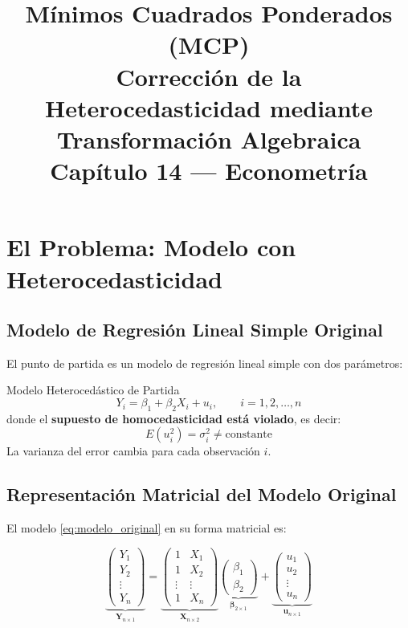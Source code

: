 \documentclass[12pt,a4paper]{article}
\title{
  \textbf{\Large Mínimos Cuadrados Ponderados (MCP)}\\[0.5em]
  \large Corrección de la Heterocedasticidad mediante Transformación Algebraica\\[0.5em]
  \normalsize Capítulo 14 --- Econometría
}
\author{}
\date{}
\begin{document}
\maketitle
\tableofcontents
\newpage

\section{El Problema: Modelo con Heterocedasticidad}

\subsection{Modelo de Regresión Lineal Simple Original}

El punto de partida es un modelo de regresión lineal simple con dos parámetros:

\begin{definicion}{Modelo Heterocedástico de Partida}
\begin{equation}
\boxed{Y_i = \beta_1 + \beta_2 X_i + u_i, \qquad i = 1, 2, \ldots, n}
\label{eq:modelo_original}
\end{equation}
donde el \textbf{supuesto de homocedasticidad está violado}, es decir:
\begin{equation}
E(u_i^2) = \sigma_i^2 \neq \text{constante}
\end{equation}
La varianza del error cambia para cada observación $i$.
\end{definicion}

\subsection{Representación Matricial del Modelo Original}

El modelo \eqref{eq:modelo_original} en su forma matricial es:

\begin{equation}
\underbrace{\begin{pmatrix} Y_1 \\ Y_2 \\ \vdots \\ Y_n \end{pmatrix}}_{\mathbf{Y}_{n\times 1}}
=
\underbrace{\begin{pmatrix} 1 & X_1 \\ 1 & X_2 \\ \vdots & \vdots \\ 1 & X_n \end{pmatrix}}_{\mathbf{X}_{n\times 2}}
\underbrace{\begin{pmatrix} \beta_1 \\ \beta_2 \end{pmatrix}}_{\boldsymbol{\beta}_{2\times 1}}
+
\underbrace{\begin{pmatrix} u_1 \\ u_2 \\ \vdots \\ u_n \end{pmatrix}}_{\mathbf{u}_{n\times 1}}
\end{equation}
\end{document}
